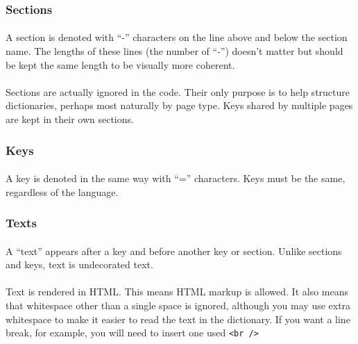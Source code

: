 \subsubsection{Sections}

\paragraph{}
A section is denoted with ``-'' characters on the line above and below the section name.  The lengths of these lines (the number of ``-'') doesn't matter but should be kept the same length to be visually more coherent.  

\paragraph{}
Sections are actually ignored in the code.  Their only purpose is to help structure dictionaries, perhaps most naturally by page type.  Keys shared by multiple pages are kept in their own sections.

\subsubsection{Keys}

\paragraph{}
A key is denoted in the same way with ``='' characters.  Keys must be the same, regardless of the language. 

\subsubsection{Texts}

\paragraph{}
A ``text'' appears after a key and before another key or section.  Unlike sections and keys, text is undecorated text.  

\paragraph{}
Text is rendered in HTML.  This means HTML markup is allowed.  It also means that whitespace other than a single space is ignored, although you may use extra whitespace to make it easier to read the text in the dictionary.  If you want a line break, for example, you will need to insert one used \texttt{<br />}

